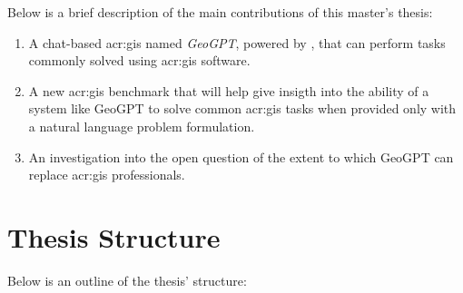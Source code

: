 Below is a brief description of the main contributions of this master's thesis:

\begin{enumerate}
    \item A chat-based \acrshort{acr:gis} named \textit{GeoGPT}, powered by , that can perform tasks commonly solved using \acrshort{acr:gis} software.
    \item A new \acrshort{acr:gis} benchmark that will help give insigth into the ability of a system like GeoGPT to solve common \acrshort{acr:gis} tasks when provided only with a natural language problem formulation.
    \item An investigation into the open question of the extent to which GeoGPT can replace \acrshort{acr:gis} professionals.
\end{enumerate}

\section{Thesis Structure}
\label{sec:thesis-structure}

\begin{comment}
This section provides the reader with an overview of what is coming in the next chapters.
You want to say more than what is explicit in the chapter name, if possible, but still keep the description short and to the point. So something along the lines of:

\begin{itemize}
    \item Chapter~\ref{cha:background_theory} introduces the theory, tools and methods necessary to understand the work.
    \item \textit{Lorem ipsum dolor sit amet, consectetur adipiscing elit.}
    \item Chapter~\ref{cha:conclusion} sums up the work and points to ways it can be improved or extended in the future.
\end{itemize}
\end{comment}

Below is an outline of the thesis' structure:

